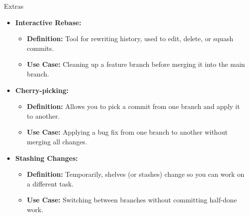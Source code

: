 \documentclass[aspectratio=169]{beamer}
\begin{document}
\begin{frame}{Extras}
\begin{itemize}
    \item \textbf{Interactive Rebase:}
    \begin{itemize}
        \item \textbf{Definition:} Tool for rewriting history, used to edit, delete, or squash commits.
        \item \textbf{Use Case:} Cleaning up a feature branch before merging it into the main branch.
    \end{itemize}
    \item \textbf{Cherry-picking:}
    \begin{itemize}
        \item \textbf{Definition:} Allows you to pick a commit from one branch and apply it to another.
        \item \textbf{Use Case:} Applying a bug fix from one branch to another without merging all changes. 
    \end{itemize}
    \item \textbf{Stashing Changes:}
    \begin{itemize}
        \item \textbf{Definition:} Temporarily, shelves (or stashes) change so you can work on a different task.
        \item \textbf{Use Case:} Switching between branches without committing half-done work.
    \end{itemize}
\end{itemize}
\end{frame}
\end{document}
